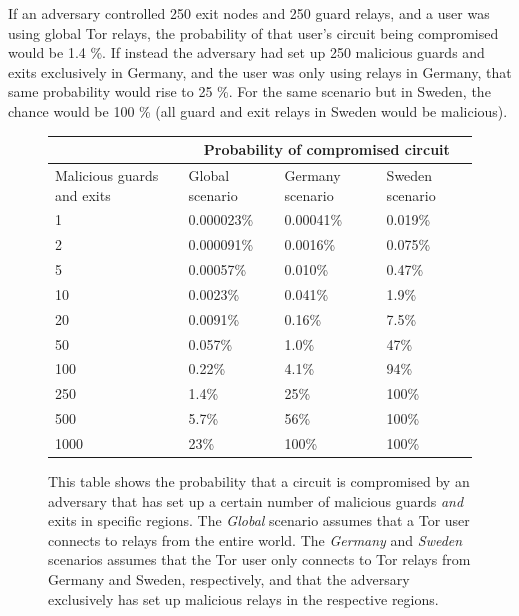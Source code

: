 \documentclass{kththesis}
\begin{document}
If an adversary controlled 250 exit nodes and 250 guard relays, and a user was using global Tor relays, the probability of that user's circuit being compromised would be 1.4 \%. If instead the adversary had set up 250 malicious guards and exits exclusively in Germany, and the user was only using relays in Germany, that same probability would rise to 25 \%. For the same scenario but in Sweden, the chance would be 100 \% (all guard and exit relays in Sweden would be malicious).

\begin{figure}[!htb]
    \centering
    \begin{center}
    \begin{tabular}{ | p{2cm} | p{1.8cm} | p{1.8cm} | p{1.8cm} | }
    \cline{2-4}
    \multicolumn{1}{c}{}  & \multicolumn{3}{|c|}{Probability of compromised circuit}\\
     \hline 
     Malicious guards and exits & Global scenario & Germany scenario & Sweden scenario \\ [0.5ex]
     \hline
     1 & 0.000023\% & 0.00041\% & 0.019\% \\ 
     2 & 0.000091\% & 0.0016\% & 0.075\% \\
     5 & 0.00057\% & 0.010\% & 0.47\% \\
     10 & 0.0023\% & 0.041\% & 1.9\% \\
     20 & 0.0091\% & 0.16\% & 7.5\% \\
     50 & 0.057\% & 1.0\% & 47\% \\
     100 & 0.22\% & 4.1\% & 94\% \\
     250 & 1.4\% & 25\% & 100\% \\
     500 & 5.7\% & 56\% & 100\% \\
     1000 & 23\% & 100\% & 100\% \\
     \hline
    \end{tabular}
    \caption{This table shows the probability that a circuit is compromised by an adversary that has set up a certain number of malicious guards \emph{and} exits in specific regions. The \emph{Global} scenario assumes that a Tor user connects to relays from the entire world. The \emph{Germany} and \emph{Sweden} scenarios assumes that the Tor user only connects to Tor relays from Germany and Sweden, respectively, and that the adversary exclusively has set up malicious relays in the respective regions.}
    \label{table:guardexitcompromise}
    \end{center}
\end{figure}
\end{document}
